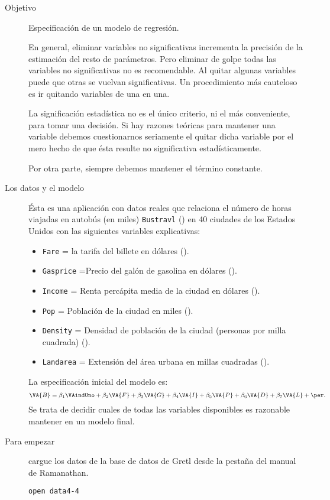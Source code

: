 \documentclass[11pt]{article}
\begin{document}
\begin{description}
\item[{Objetivo}] Especificación de un modelo de regresión.

En general, eliminar variables no significativas incrementa la
precisión de la estimación del resto de parámetros. Pero eliminar de
golpe todas las variables no significativas no es recomendable. Al
quitar algunas variables puede que otras se vuelvan
significativas. Un procedimiento más cauteloso es ir quitando
variables de una en una.

La significación estadística no es el único criterio, ni el más
conveniente, para tomar una decisión. Si hay razones teóricas para
mantener una variable debemos cuestionarnos seriamente el quitar
dicha variable por el mero hecho de que ésta resulte no
significativa estadísticamente.

Por otra parte, siempre debemos mantener el término constante.

\item[{Los datos y el modelo}] Ésta es una aplicación con datos reales que
relaciona el número de horas viajadas en autobús (en miles)
\texttt{Bustravl} () en 40 ciudades de los Estados Unidos con las
siguientes variables explicativas:
\begin{itemize}
\item \texttt{Fare} = la tarifa del billete en dólares ().
\item \texttt{Gasprice} =Precio del galón de gasolina en dólares ().
\item \texttt{Income} = Renta percápita media de la ciudad en dólares ().
\item \texttt{Pop} = Población de la ciudad en miles ().
\item \texttt{Density} = Densidad de población de la ciudad (personas por milla
cuadrada) ().
\item \texttt{Landarea} = Extensión del área urbana en millas cuadradas ().
\end{itemize}

La especificación inicial del modelo es:
\begin{displaymath}
  \VA{B}=
  \beta_1\VAindUno+
  \beta_2\VA{F}+
  \beta_3\VA{G}+
  \beta_4\VA{I}+
  \beta_5\VA{P}+
  \beta_6\VA{D}+
  \beta_7\VA{L}+
  \per.
\end{displaymath}
Se trata de decidir cuales de todas las variables disponibles es
razonable mantener en un modelo final.

\item[{Para empezar}] cargue los datos de la base de datos de Gretl desde
la pestaña del manual de Ramanathan.
\begin{verbatim}
open data4-4
\end{verbatim}
\end{description}
\end{document}
